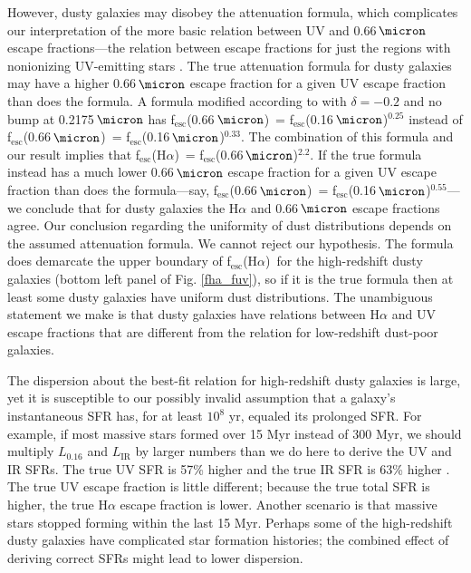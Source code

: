 \documentclass[preprint]{aastex}
\newcommand{\alephuv}{f$_{\mathrm{esc}}$(0.16$\,\micron$)}
\newcommand{\alephha}{f$_{\mathrm{esc}}$(H$\alpha$)}
\newcommand{\alephuvha}{f$_{\mathrm{esc}}$(0.66$\,\micron$)}
\begin{document}
However, dusty galaxies may disobey the \citet{calzetti00} attenuation
formula, which complicates our interpretation of the more basic relation
between UV and 0.66$\,\micron$ escape fractions---the relation between
escape fractions for just the regions with nonionizing UV-emitting stars
\citep{reddy10,reddy12,buat11,buat12,penner12,kriek13}.  The true attenuation
formula for dusty galaxies may have a higher 0.66$\,\micron$ escape fraction
for a given UV escape fraction than does the \citet{calzetti00} formula.  A
formula modified according to
\citet{kriek13} with $\delta = -0.2$ and no bump at 0.2175$\,\micron$ has
\alephuvha~=
\alephuv$^{0.25}$ instead of \alephuvha~= \alephuv$^{0.33}$.  The combination of
this \citet{kriek13} formula and our result implies that
\alephha~= \alephuvha$^{2.2}$.  If the true formula instead has a
much lower 0.66$\,\micron$ escape fraction for a given UV escape
fraction than does the \citet{calzetti00} formula---say, \alephuvha~=
\alephuv$^{0.55}$---we conclude that for dusty
galaxies the H$\alpha$ and 0.66$\,\micron$ escape fractions agree.  Our
conclusion regarding the uniformity of dust distributions depends on the
assumed attenuation formula.  We cannot reject our hypothesis.  The
\citet{calzetti00} formula does demarcate the upper boundary of \alephha~for the
high-redshift dusty galaxies (bottom left panel of Fig. \ref{fha_fuv}), so
if it is the true formula then at least some dusty galaxies have uniform
dust distributions.  The unambiguous statement we make is that dusty galaxies
have relations between H$\alpha$ and UV escape fractions that are different from
the relation for low-redshift dust-poor galaxies.

The dispersion about the best-fit relation for high-redshift dusty galaxies
is large, yet it is susceptible
to our possibly invalid assumption that a galaxy's instantaneous SFR has,
for at least $10^{8}$ yr, equaled its prolonged SFR.  For example, if most
massive stars formed over 15 Myr instead of 300 Myr, we should multiply
$L_{0.16}$ and $L_{\mathrm{IR}}$ by larger numbers than we do here to derive the
UV and IR SFRs.  The true UV SFR is 57\% higher and the true IR SFR is 63\%
higher \citep{madau14}.  The true UV escape fraction is little different;
because the true total SFR is higher, the true H$\alpha$ escape fraction is
lower.  Another scenario is that massive stars stopped forming within the last
15 Myr.  Perhaps some of the high-redshift dusty galaxies have
complicated star formation histories; the combined effect of deriving correct
SFRs might lead to lower dispersion.
\end{document}

